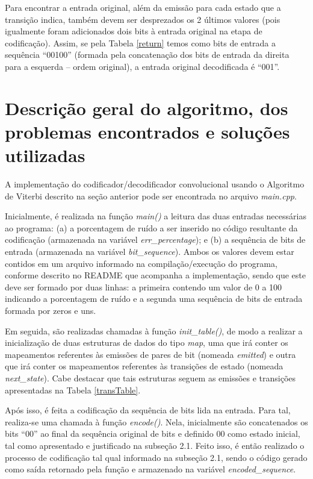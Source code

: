 \documentclass[12pt]{article}
\begin{document}
Para encontrar a entrada original, além da emissão para cada estado que a transição indica, também devem ser desprezados os 2 últimos valores (pois igualmente foram adicionados dois bits à entrada original na etapa de codificação). Assim, se pela Tabela \ref{return} temos como bits de entrada a sequência ``00100'' (formada pela concatenação dos bits de entrada da direita para a esquerda -- ordem original), a entrada original decodificada é ``001''. 

\section{Descrição geral do algoritmo, dos problemas encontrados e soluções utilizadas}

A implementação do codificador/decodificador convolucional usando o Algoritmo de Viterbi descrito na seção anterior pode ser encontrada no arquivo \emph{main.cpp}.

Inicialmente, é realizada na função \emph{main()} a leitura das duas entradas necessárias ao programa: (a) a porcentagem de ruído a ser inserido no código resultante da codificação (armazenada na variável \emph{err\_percentage}); e (b) a sequência de bits de entrada (armazenada na variável \emph{bit\_sequence}). Ambos os valores devem estar contidos em um arquivo informado na compilação/execução do programa, conforme descrito no README que acompanha a implementação, sendo que este deve ser formado por duas linhas: a primeira contendo um valor de 0 a 100 indicando a porcentagem de ruído e a segunda uma sequência de bits de entrada formada por zeros e uns.

Em seguida, são realizadas chamadas à função \emph{init\_table()}, de modo a realizar a inicialização de duas estruturas de dados do tipo \emph{map}, uma que irá conter os mapeamentos referentes às emissões de pares de bit (nomeada \emph{emitted}) e outra que irá conter os mapeamentos referentes às transições de estado (nomeada \emph{next\_state}). Cabe destacar que tais estruturas seguem as emissões e transições apresentadas na Tabela \ref{transTable}.

Após isso, é feita a codificação da sequência de bits lida na entrada. Para tal, realiza-se uma chamada à função \emph{encode()}. Nela, inicialmente são concatenados os bits ``00'' ao final da sequência original de bits e definido 00 como estado inicial, tal como apresentado e justificado na subseção 2.1. Feito isso, é então realizado o processo de codificação tal qual informado na subseção 2.1, sendo o código gerado como saída retornado pela função e armazenado na variável \emph{encoded\_sequence}.
\end{document}
